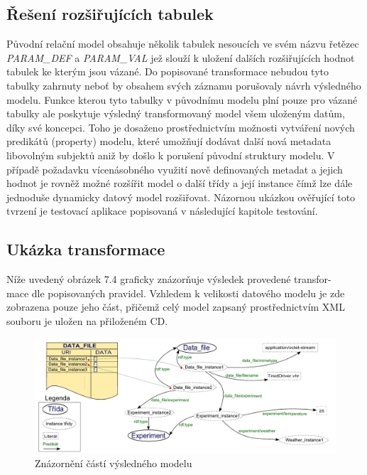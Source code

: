 \documentclass{projekt}
\begin{document}
\subsection{Řešení rozšiřujících tabulek}
\hspace{0.65cm}Původní relační model obsahuje několik tabulek nesoucích ve svém názvu řetězec {\it PARAM\_DEF} a {\it PARAM\_VAL} jež slouží k uložení dalších rozšiřujících hodnot tabulek ke kterým jsou vázané. Do popisované transformace nebudou tyto tabulky zahrnuty neboť by obsahem svých záznamu porušovaly návrh výsledného modelu. Funkce kterou tyto tabulky v původnímu modelu plní pouze pro vázané tabulky ale poskytuje výsledný transformovaný model všem uloženým datům, díky své koncepci. Toho je dosaženo prostřednictvím možnosti vytváření nových predikátů (property) modelu, které umožňují dodávat další nová metadata libovolným subjektů aniž by došlo k porušení původní struktury modelu. V případě požadavku vícenásobného využití nově definovaných metadat a jejich hodnot je rovněž možné rozšířit model o další třídy a její instance čímž lze dále jednoduše dynamicky datový model rozšiřovat. Názornou ukázkou ověřující toto tvrzení je testovací aplikace popisovaná v následující kapitole testování. 

\subsection{Ukázka transformace}
\hspace{0.65cm}Níže uvedený obrázek 7.4 graficky znázorňuje výsledek provedené transfor-\\mace dle popisovaných pravidel. Vzhledem k velikosti datového modelu je zde zobrazena pouze jeho část, přičemž celý model zapsaný prostřednictvím XML souboru je uložen na přiloženém CD.


\begin{figure}[htb]
\begin{center}
\includegraphics[scale=0.52]{vysledne.pdf}
\caption{Znázornění částí výsledného modelu}
\end{center}
\end{figure}
\end{document}
